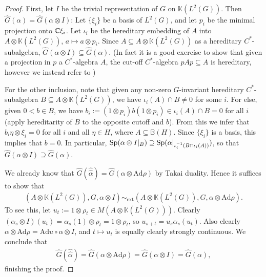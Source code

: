 \begin{proof}
	First, let $I$ be the trivial representation of $G$ on $\mathbb{K}(L^2(G))$. Then $\hat G(\alpha) = \hat G(\alpha \otimes I)$:
	Let $\{\xi_i\}$ be a basis of $L^2(G)$, and let $p_i$ be the minimal projection onto $\mathbb{C} \xi_i$. Let $\iota_i$ be the hereditary embedding of $A$ into $A \otimes \mathbb{K}(L^2(G))$, $a \mapsto a \otimes p_i$. Since $A \subseteq A \otimes \mathbb{K}(L^2(G))$ as a hereditary $C^*$-subalgebra, $\hat G(\alpha \otimes I) \subseteq \hat G(\alpha)$. (In fact it is a good exercise to show that given a projection in $p$ a $C^*$-algebra $A$, the cut-off $C^*$-algebra $pAp \subseteq A$ is hereditary, however we instead refer to \cite[Example II.7.3.14]{blackadar})
	
	For the other inclusion, note that given any non-zero $G$-invariant hereditary $C^*$-subalgebra $B \subseteq A \otimes \mathbb{K}(L^2(G))$, we have $\iota_i(A) \cap B \neq 0$ for some $i$. For else, given $0 < b \in B$, we have $b_i := (1 \otimes p_i) b (1\otimes p_i)  \in \iota_i(A) \cap B= 0$ for all $i$ (apply hereditarity of $B$ to the opposite cutoff and $b$). From this we infer that $b_i \eta \otimes \xi_i = 0$ for all $i$ and all $\eta \in H$, where $A \subseteq \mathbb{B}(H)$. Since $\{\xi_i\} $ is a basis, this implies that $b = 0$. In particular, $\mathrm{Sp}(\alpha \otimes I |_B) \supseteq \mathrm{Sp}( \alpha |_{\iota_i^{-1}(B \cap \iota_i(A))})$, so that $\hat G(\alpha \otimes I) \supseteq \hat G(\alpha)$.

	We already know that $\hat G(\hat{\hat \alpha}) = \hat G(\alpha \otimes \mathrm{Ad} \rho)$ by Takai duality. Hence it suffices to show that
	\begin{align*}
		(A \otimes \mathbb{K}(L^2(G)), G , \alpha \otimes I) \sim_{\mathrm{ext}} (A \otimes \mathbb{K}(L^2(G)), G , \alpha \otimes \mathrm{Ad} \rho).
	\end{align*}
	To see this, let $u_t := 1 \otimes \rho_t \in M(A \otimes \mathbb{K}(L^2(G)))$. Clearly $(\alpha_s \otimes I) (u_t) = \alpha_s(1) \otimes \rho_t = 1 \otimes \rho_t$, so $u_{s+t}= u_s \alpha_s(u_t)$. Also clearly $\alpha \otimes \mathrm{Ad} \rho = \mathrm{Ad} u \circ \alpha \otimes I$, and $t \mapsto u_t$ is equally clearly strongly continuous. We conclude that 
	\begin{align*}
		\hat G ( \hat {\hat \alpha}) = \hat G ( \alpha \otimes \mathrm{Ad} \rho) = \hat G( \alpha \otimes I) = \hat G( \alpha),
	\end{align*}
	finishing the proof.
\end{proof}
